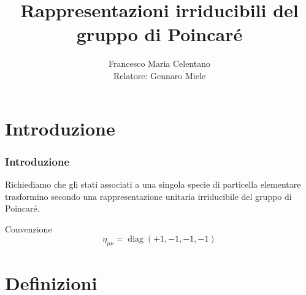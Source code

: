 \documentclass[11pt,t,aspectratio=169]{beamer}
\title{Rappresentazioni irriducibili del gruppo di Poincaré}
\author[Francesco Maria Celentano]{%
    Francesco Maria Celentano\\[0.4em]
    \small Relatore: Gennaro Miele
}
\institute{Università degli Studi di Napoli Federico II}
\begin{document}

\begin{frame}
    \titlepage
\end{frame}


\section{Introduzione}

\begin{frame}[c]
    \frametitle{Introduzione}

    \begin{center}
      \LARGE
      Richiediamo che gli stati associati a una singola specie di particella elementare trasformino secondo una rappresentazione unitaria irriducibile del gruppo di Poincaré.
    \end{center}

    \vspace{0.6cm}

    \begin{block}{Convenzione}
        \[
            \eta_{\mu\nu}
            =
            \operatorname{diag}(+1,-1,-1,-1)
        \]
    \end{block}

\end{frame}


\section{Definizioni}
\end{document}

